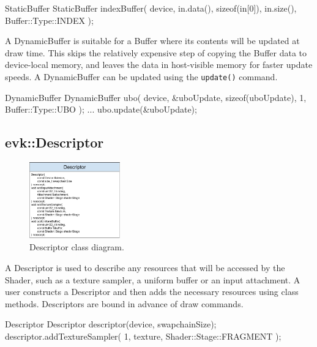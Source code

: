 \documentclass[12pt]{report}
\theoremstyle{definition}
\begin{document}
        \begin{usage}{StaticBuffer}
  StaticBuffer indexBuffer(
    device, in.data(), sizeof(in[0]),
    in.size(), Buffer::Type::INDEX
  );
        \end{usage}

        A DynamicBuffer is suitable for a Buffer where its contents will be updated at
        draw time. This skips the relatively expensive step of copying the
        Buffer data to device-local memory, and leaves the data in host-visible
        memory for faster update speeds. A DynamicBuffer can be updated
        using the \texttt{update()} command.

        \begin{usage}{DynamicBuffer}
  DynamicBuffer ubo(
      device, &uboUpdate, sizeof(uboUpdate),
      1, Buffer::Type::UBO
  );
  ...
  ubo.update(&uboUpdate);
        \end{usage}

      \subsection{evk::Descriptor}

        \begin{figure}[h]
          \centering
          \includegraphics[width=0.35\textwidth]{images/class_descriptor.png}
          \caption{Descriptor class diagram.}
          \label{fig:class_descriptor}
        \end{figure}

        A Descriptor is used to describe any resources that will be accessed by
        the Shader, such as a texture sampler, a uniform buffer or an input
        attachment. A user constructs a Descriptor and then adds the necessary
        resources using class methods. Descriptors are bound in advance of draw
        commands.

        \begin{usage}{Descriptor}
  Descriptor descriptor(device, swapchainSize);
  descriptor.addTextureSampler(
    1, texture, Shader::Stage::FRAGMENT
  );
        \end{usage}
\end{document}
